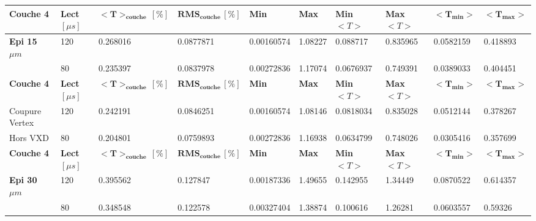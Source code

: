   \medskip
  
\begin{table}
\small
\begin{center}
\begin{tabular}{|l|l|l|l|l|l|l|l|l|l|}
\hline
\textbf{Couche 4} & \textbf{Lect} $[\mu s]$ & $\mathbf{<T>_{couche} \, [\%]}$ & $\mathbf{RMS_{couche} \, [\%]}$ & \textbf{Min} & \textbf{Max} & \textbf{Min} $<T>$ & \textbf{Max} $<T>$ & $\mathbf{<T_{min}>}$ & $\mathbf{<T_{max}>}$ \\ \hline
    \textbf{Epi 15} $\mu m$                          & 120           & 0.268016                 & 0.0877871               & 0.00160574 & 1.08227   & 0.088717      & 0.835965      & 0.0582159       & 0.418893        \\ \hline
                              & 80            & 0.235397                 & 0.0837978               & 0.00272836 & 1.17074   & 0.0676937     & 0.749391      & 0.0389033       & 0.404451        \\ \hline
\textbf{Couche 4} & \textbf{Lect} $[\mu s]$ & $\mathbf{<T>_{couche} \, [\%]}$ & $\mathbf{RMS_{couche} \, [\%]}$ & \textbf{Min} & \textbf{Max} & \textbf{Min} $<T>$ & \textbf{Max} $<T>$ & $\mathbf{<T_{min}>}$ & $\mathbf{<T_{max}>}$ \\ \hline
Coupure Vertex                & 120           & 0.242191                 & 0.0846251               & 0.00160574 & 1.08146   & 0.0818034     & 0.835028      & 0.0512144       & 0.378267        \\ \hline
Hors VXD                      & 80            & 0.204801                 & 0.0759893               & 0.00272836 & 1.16938   & 0.0634799     & 0.748026      & 0.0305416       & 0.357699        \\ \hline
\textbf{Couche 4} & \textbf{Lect} $[\mu s]$ & $\mathbf{<T>_{couche} \, [\%]}$ & $\mathbf{RMS_{couche} \, [\%]}$ & \textbf{Min} & \textbf{Max} & \textbf{Min} $<T>$ & \textbf{Max} $<T>$ & $\mathbf{<T_{min}>}$ & $\mathbf{<T_{max}>}$ \\ \hline
    \textbf{Epi 30} $\mu m$                          & 120           & 0.395562                 & 0.127847                & 0.00187336 & 1.49655   & 0.142955      & 1.34449       & 0.0870522       & 0.614357        \\ \hline
                              & 80            & 0.348548                 & 0.122578                & 0.00327404 & 1.38874   & 0.100616      & 1.26281       & 0.0603557       & 0.59326         \\ \hline

\end{tabular}
\end{center}
\end{table}
